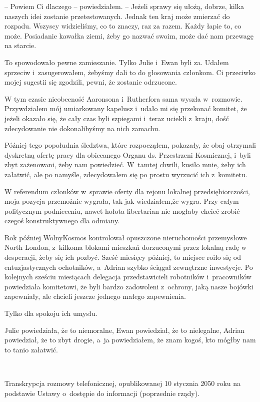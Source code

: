 \documentclass[oneside,polish,11pt,sfheadings]{mwbk}
\begin{document}
-- Powiem Ci dlaczego -- powiedziałem. -- Jeżeli sprawy się ułożą, dobrze,
kilka naszych idei zostanie przetestowanych. Jednak ten kraj może
zmierzać do rozpadu. Wszyscy widzieliśmy, co to znaczy, raz za razem.
Każdy łapie to, co może. Posiadanie kawałka ziemi, żeby go nazwać swoim,
może dać nam przewagę na starcie.

To spowodowało pewne zamieszanie. Tylko Julie i~Ewan byli za. Udałem
sprzeciw i~zasugerowałem, żebyśmy dali to do głosowania członkom. Ci
przeciwko mojej sugestii się zgodzili, pewni, że zostanie odrzucone.

W tym czasie nieobecność Aaronsona i~Rutherfora sama wyszła w~rozmowie.
Przywdziałem mój umiarkowany kapelusz i~udało mi się przekonać komitet,
że jeżeli okazało się, że cały czas byli szpiegami i~teraz uciekli z~kraju, dość zdecydowanie nie dokonalibyśmy na nich zamachu.

Później tego popołudnia śledztwa, które rozpocząłem, pokazały, że obaj
otrzymali dyskretną ofertę pracy dla obiecanego Organu ds. Przestrzeni
Kosmicznej, i~byli zbyt zażenowani, żeby nam powiedzieć. W~tamtej
chwili, kusiło mnie, żeby ich załatwić, ale po namyśle, zdecydowałem się
po prostu wyrzucić ich z~komitetu.

W referendum członków w~sprawie oferty dla rejonu lokalnej
przedsiębiorczości, moja pozycja przemożnie wygrała, tak jak
wiedziałem,że wygra. Przy całym politycznym podnieceniu, nawet hołota
libertarian nie mogłaby chcieć zrobić czegoś konstruktywnego dla
odmiany.

Rok później WolnyKosmos kontrolował opuszczone nieruchomości przemysłowe
North London, z~kilkoma blokami mieszkań dorzuconymi przez lokalną radę
w desperacji, żeby się ich pozbyć. Sześć miesięcy później, to miejsce
roiło się od entuzjastycznych ochotników, a~Adrian szybko ściągał
zewnętrzne inwestycje. Po kolejnych sześciu miesiącach delegacja
przedstawicieli robotników i~pracowników powiedziała komitetowi, że byli
bardzo zadowoleni z~ochrony, jaką nasze bojówki zapewniały, ale chcieli
jeszcze jednego małego zapewnienia.

Tylko dla spokoju ich umysłu.

Julie powiedziała, że to niemoralne, Ewan powiedział, że to nielegalne,
Adrian powiedział, że to zbyt drogie, a~ja powiedziałem, że znam kogoś,
kto mógłby nam to tanio załatwić.

~

Transkrypcja rozmowy telefonicznej, opublikowanej 10 stycznia 2050 roku
na podstawie Ustawy o~dostępie do informacji (poprzednie rządy).
\end{document}
